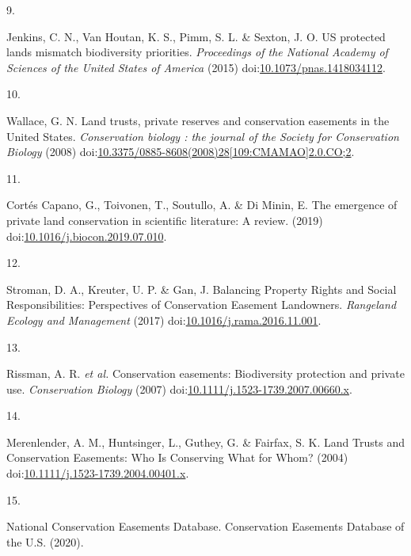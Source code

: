 \documentclass[3p]{elsarticle} %
\newlength{\cslhangindent}
\newlength{\csllabelwidth}
\newlength{\cslentryspacingunit} %
\newenvironment{CSLReferences}[2] %
 {%
  \setlength{\parindent}{0pt}
  \ifodd #1
  \let\oldpar\par
  \def\par{\hangindent=\cslhangindent\oldpar}
  \fi
  \setlength{\parskip}{#2\cslentryspacingunit}
 }%
 {}
\newcommand{\CSLLeftMargin}[1]{\parbox[t]{\csllabelwidth}{#1}}
\newcommand{\CSLRightInline}[1]{\parbox[t]{\linewidth - \csllabelwidth}{#1}\break}
\begin{document}
\begin{CSLReferences}{0}{0}
\leavevmode{}%
\CSLLeftMargin{9. }
\CSLRightInline{Jenkins, C. N., Van Houtan, K. S., Pimm, S. L. \&
Sexton, J. O. {US protected lands mismatch biodiversity priorities}.
\emph{Proceedings of the National Academy of Sciences of the United
States of America} (2015)
doi:\href{https://doi.org/10.1073/pnas.1418034112}{10.1073/pnas.1418034112}.}

\leavevmode{}%
\CSLLeftMargin{10. }
\CSLRightInline{Wallace, G. N. {Land trusts, private reserves and
conservation easements in the United States}. \emph{Conservation biology
: the journal of the Society for Conservation Biology} (2008)
doi:\href{https://doi.org/10.3375/0885-8608(2008)28\%5B109:CMAMAO\%5D2.0.CO;2}{10.3375/0885-8608(2008)28{[}109:CMAMAO{]}2.0.CO;2}.}

\leavevmode{}%
\CSLLeftMargin{11. }
\CSLRightInline{Cortés Capano, G., Toivonen, T., Soutullo, A. \& Di
Minin, E. {The emergence of private land conservation in scientific
literature: A review}. (2019)
doi:\href{https://doi.org/10.1016/j.biocon.2019.07.010}{10.1016/j.biocon.2019.07.010}.}

\leavevmode{}%
\CSLLeftMargin{12. }
\CSLRightInline{Stroman, D. A., Kreuter, U. P. \& Gan, J. {Balancing
Property Rights and Social Responsibilities: Perspectives of
Conservation Easement Landowners}. \emph{Rangeland Ecology and
Management} (2017)
doi:\href{https://doi.org/10.1016/j.rama.2016.11.001}{10.1016/j.rama.2016.11.001}.}

\leavevmode{}%
\CSLLeftMargin{13. }
\CSLRightInline{Rissman, A. R. \emph{et al.} {Conservation easements:
Biodiversity protection and private use}. \emph{Conservation Biology}
(2007)
doi:\href{https://doi.org/10.1111/j.1523-1739.2007.00660.x}{10.1111/j.1523-1739.2007.00660.x}.}

\leavevmode{}%
\CSLLeftMargin{14. }
\CSLRightInline{Merenlender, A. M., Huntsinger, L., Guthey, G. \&
Fairfax, S. K. {Land Trusts and Conservation Easements: Who Is
Conserving What for Whom?} (2004)
doi:\href{https://doi.org/10.1111/j.1523-1739.2004.00401.x}{10.1111/j.1523-1739.2004.00401.x}.}

\leavevmode{}%
\CSLLeftMargin{15. }
\CSLRightInline{National Conservation Easements Database. {Conservation
Easements Database of the U.S.} (2020).}


\end{CSLReferences}
\end{document}
